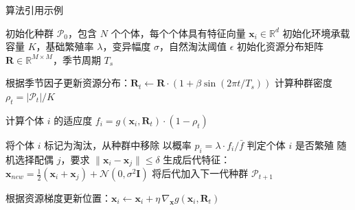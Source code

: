 算法引用示例  %


\begin{algorithm}[h]
  \caption{基于个体模拟的种群动态演化算法}
  \label{alg:population-sim}
  \begin{algorithmic}[1]
    \STATE 初始化种群 $\mathcal{P}_0$，包含 $N$ 个个体，每个个体具有特征向量 $\mathbf{x}_i \in \mathbb{R}^d$
    \STATE 初始化环境承载容量 $K$，基础繁殖率 $\lambda$，变异幅度 $\sigma$，自然淘汰阈值 $\epsilon$
    \STATE 初始化资源分布矩阵 $\mathbf{R} \in \mathbb{R}^{M \times M}$，季节周期 $T_s$

      \STATE 根据季节因子更新资源分布：$\mathbf{R}_t \gets \mathbf{R} \cdot (1 + \beta \sin(2\pi t / T_s))$
      \STATE 计算种群密度 $\rho_t = |\mathcal{P}_t| / K$

        \STATE 计算个体 $i$ 的适应度 $f_i = g(\mathbf{x}_i, \mathbf{R}_t) \cdot (1 - \rho_t)$

          \STATE 将个体 $i$ 标记为淘汰，从种群中移除
        \ELSE
          \STATE 以概率 $p_i = \lambda \cdot f_i / \bar{f}$ 判定个体 $i$ 是否繁殖
            \STATE 随机选择配偶 $j$，要求 $\|\mathbf{x}_i - \mathbf{x}_j\| \leq \delta$
            \STATE 生成后代特征：$\mathbf{x}_{new} = \frac{1}{2}(\mathbf{x}_i + \mathbf{x}_j) + \mathcal{N}(0, \sigma^2 \mathbf{I})$
            \STATE 将后代加入下一代种群 $\mathcal{P}_{t+1}$
          \ENDIF
        \ENDIF
      \ENDWHILE

        \STATE 根据资源梯度更新位置：$\mathbf{x}_i \gets \mathbf{x}_i + \eta \, \nabla_{\mathbf{x}} g(\mathbf{x}_i, \mathbf{R}_t)$
      \ENDFOR
    \ENDFOR
  \end{algorithmic}
\end{algorithm}

